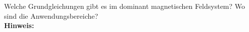 \begin{question}[section=3,subsection=34,name={Dominant Magnetisch},difficulty=7,type=mdl,tags={}]
	Welche Grundgleichungen gibt es im dominant magnetischen Feldsystem? Wo sind die Anwendungsbereiche?
	\\ \textbf{Hinweis:}\\
	
\end{question}
\begin{solution}
	
\end{solution}